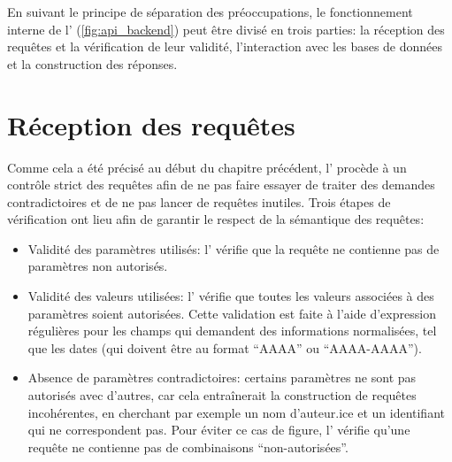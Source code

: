 En suivant le principe de séparation des préoccupations, le fonctionnement interne de l'\api{} (\ref{fig:api_backend}) peut être divisé en trois parties: la réception des requêtes et la vérification de leur validité, l'interaction avec les bases de données et la construction des réponses.

\section{Réception des requêtes}
Comme cela a été précisé au début du chapitre précédent, l'\api{} procède à un contrôle strict des requêtes afin de ne pas faire essayer de traiter des demandes contradictoires et de ne pas lancer de requêtes inutiles. Trois étapes de vérification ont lieu afin de garantir le respect de la sémantique des requêtes:

\begin{itemize}
	\item Validité des paramètres utilisés: l'\api{} vérifie que la requête ne contienne pas de paramètres non autorisés.
	\item Validité des valeurs utilisées: l'\api{} vérifie que toutes les valeurs associées à des paramètres soient autorisées. Cette validation est faite à l'aide d'\glspl{expression régulière} pour les champs qui demandent des informations normalisées, tel que les dates (qui doivent être au format \enquote{AAAA} ou \enquote{AAAA-AAAA}).
	\item Absence de paramètres contradictoires: certains paramètres ne sont pas autorisés avec d'autres, car cela entraînerait la construction de requêtes incohérentes, en cherchant par exemple un nom d'auteur.ice et un identifiant qui ne correspondent pas. Pour éviter ce cas de figure, l'\api{} vérifie qu'une requête ne contienne pas de combinaisons \enquote{non-autorisées}.
\end{itemize}

